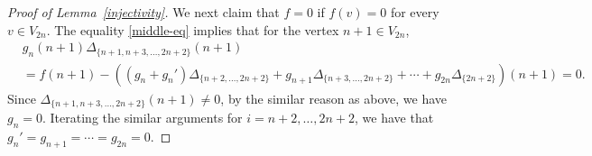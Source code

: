 \documentclass[12pt]{amsart}
\theoremstyle{remark}
\numberwithin{equation}{section}
\begin{document}
\begin{proof}[Proof of Lemma~\ref{injectivity}]
We next claim that $f=0$ if $f(v)=0$ for every $v\in V_{2n}$.
The equality \eqref{middle-eq} implies that for the vertex $n+1\in V_{2n}$,
\begin{align*}
&g_{n}(n+1)\Delta_{\{n+1,n+3,\ldots, 2n+2\}}(n+1) \\
&=f(n+1)-\left((g_{n}+g_{n}')\Delta_{\{n+2,\ldots, 2n+2\}}+g_{n+1}\Delta_{\{n+3,\ldots, 2n+2\}}+\cdots 
+g_{2n}\Delta_{\{2n+2\}}\right)(n+1)=0.
\end{align*}
Since $\Delta_{\{n+1,n+3,\ldots, 2n+2\}}(n+1)\not=0$, by the similar reason as above, we have $g_{n}=0$.
Iterating the similar arguments for $i=n+2,\ldots, 2n+2$, 
we have that $g_{n}'=g_{n+1}=\cdots =g_{2n}=0$.

\end{proof}
\end{document}
